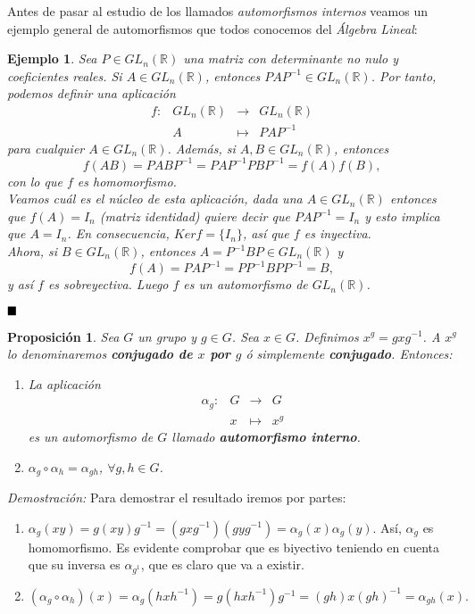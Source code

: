 \documentclass[12pt]{article}
\newtheorem{proposition}[theorem]{Proposición}
\newtheorem{example}{Ejemplo}[theorem]
\begin{document}
Antes de pasar al estudio de los llamados \textit{automorfismos internos} veamos un ejemplo general de automorfismos que todos conocemos del \textit{Álgebra Lineal}:

\begin{example}
Sea $P \in GL_{n}(\mathbb{R})$ una matriz con determinante no nulo y coeficientes reales. Si $A \in GL_{n}(\mathbb{R})$, entonces $PAP^{-1} \in GL_{n}(\mathbb{R})$. Por tanto, podemos definir una aplicación$$\begin{array}{rccl}
f\colon &GL_{n}(\mathbb{R})& \longrightarrow &GL_{n}(\mathbb{R})\\
&A& \longmapsto &PAP^{-1}
\end{array}
$$ para cualquier $A \in GL_{n}(\mathbb{R})$. Además, si $A,B \in GL_{n}(\mathbb{R})$, entonces $$f(AB) = PABP^{-1} = PAP^{-1}PBP^{-1} = f(A)f(B),$$ con lo que $f$ es homomorfismo.\vspace{0.2cm}\\
Veamos cuál es el núcleo de esta aplicación, dada una $A \in GL_{n}(\mathbb{R})$ entonces que $f(A) = I_{n}$ (matriz identidad) quiere decir que $PAP^{-1} = I_{n}$ y esto implica que $A = I_{n}$. En consecuencia, $Ker f = \lbrace I_{n} \rbrace$, así que $f$ es inyectiva.\vspace{0.2cm}\\
Ahora, si $B \in GL_{n}(\mathbb{R})$, entonces $A = P^{-1}BP \in GL_{n}(\mathbb{R})$ y $$f(A) = PAP^{-1} = PP^{-1}BPP^{-1} = B,$$ y así $f$ es sobreyectiva. Luego $f$ es un automorfismo de $GL_{n}(\mathbb{R})$.
\end{example}
$\hfill \blacksquare$

\begin{proposition}Sea $G$ un grupo y $g \in G$. Sea $x \in G$. Definimos $x^{g} = gxg^{-1}$. A $x^g$ lo denominaremos \textbf{conjugado de $x$ por $g$} ó simplemente \textbf{conjugado}. Entonces: 
\begin{enumerate}
\item La aplicación $$\begin{array}{rccl}
\alpha_{g}\colon &G& \longrightarrow &G\\
&x& \longmapsto &x^{g}
\end{array}
$$ es un automorfismo de $G$ llamado \textbf{automorfismo interno}.
\item $\alpha_{g} \circ \alpha_{h} = \alpha_{gh}$, $\forall g,h \in G$.
\end{enumerate}
\end{proposition}
\emph{Demostración: } Para demostrar el resultado iremos por partes:
\begin{enumerate}
\item $\alpha_{g}(xy)=g(xy)g^{-1} = (gxg^{-1})(gyg^{-1}) = \alpha_{g}(x)\alpha_{g}(y)$. Así, $\alpha_{g}$ es homomorfismo. Es evidente comprobar que es biyectivo teniendo en cuenta que su inversa es $\alpha_{g^1}$, que es claro que va a existir.
\item $(\alpha_{g} \circ \alpha_{h})(x) = \alpha_{g}(hxh^{-1}) = g(hxh^{-1})g^{-1}=(gh)x(gh)^{-1} = \alpha_{gh}(x).$
\end{enumerate}
\end{document}
